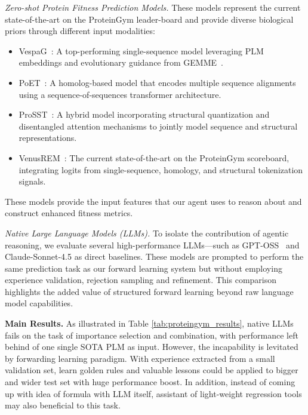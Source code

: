 \documentclass{article}
\begin{document}
\textit{Zero-shot Protein Fitness Prediction Models.} These models represent the current state-of-the-art on the ProteinGym leader-board and provide diverse biological priors through different input modalities:
\begin{itemize}
    \item VespaG~\cite{marquet2024expert, marquet2022embeddings}: A top-performing single-sequence model leveraging PLM embeddings and evolutionary guidance from GEMME~\cite{laine2019gemme}.
    \item PoET~\cite{truong2023poet}: A homolog-based model that encodes multiple sequence alignments using a sequence-of-sequences transformer architecture.
    \item ProSST~\cite{li2024prosst}: A hybrid model incorporating structural quantization and disentangled attention mechanisms to jointly model sequence and structural representations.
    \item VenusREM~\cite{tan2025high}: The current state-of-the-art on the ProteinGym scoreboard, integrating logits from single-sequence, homology, and structural tokenization signals.
\end{itemize}
These models provide the input features that our agent uses to reason about and construct enhanced fitness metrics.

\textit{Native Large Language Models (LLMs).} To isolate the contribution of agentic reasoning, we evaluate several high-performance LLMs—such as GPT-OSS~\cite{agarwal2025gpt} and Claude-Sonnet-4.5 as direct baselines. These models are prompted to perform the same prediction task as our forward learning system but without employing experience validation, rejection sampling and refinement. This comparison highlights the added value of structured forward learning beyond raw language model capabilities.

\textbf{Main Results.} As illustrated in Table \ref{tab:proteingym_results}, native LLMs fails on the task of importance selection and combination, with performance left behind of one single SOTA PLM as input. However, the incapability is levitated by forwarding learning paradigm. With experience extracted from a small validation set, learn golden rules and valuable lessons could be applied to bigger and wider test set with huge performance boost. In addition, instead of coming up with idea of formula with LLM itself, assistant of light-weight regression tools may also beneficial to this task.
\end{document}

